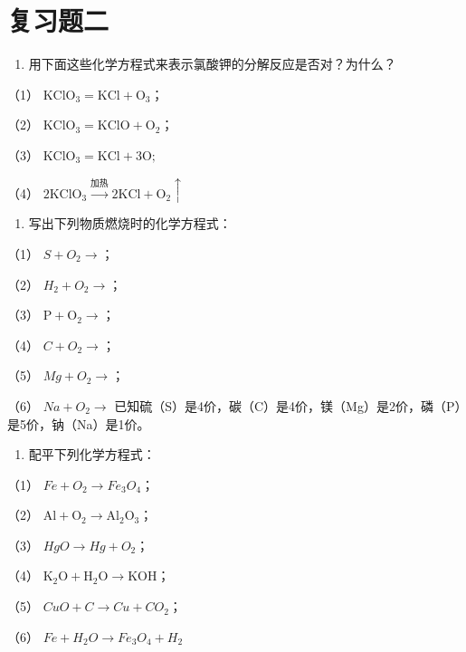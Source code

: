 \section{复习题二}

\begin{enumerate}
\item
  用下面这些化学方程式来表示氯酸钾的分解反应是否对？为什么？
\end{enumerate}

（1） \(\mathrm{KClO}_3 = \mathrm{KCl} + \mathrm{O}_3\)；

（2） \(\mathrm{KClO}_3 = \mathrm{KClO} + \mathrm{O}_2\)；

（3） \(\mathrm{KClO}_3 = \mathrm{KCl} + 3\mathrm{O};\)

（4）
\(2\mathrm{KClO}_3\xrightarrow{\text{加热}} 2\mathrm{KCl} + \mathrm{O}_2\uparrow\)

\begin{enumerate}[start=2]
\item
  写出下列物质燃烧时的化学方程式：
\end{enumerate}

（1） \(S + O_{2} \rightarrow\)；

（2） \(H_{2} + O_{2} \rightarrow\)；

（3） \(\mathrm{P} + \mathrm{O}_2 \longrightarrow\)；

（4） \(C + O_{2} \rightarrow\)；

（5） \(Mg + O_{2} \rightarrow\)；

（6） \(Na + O_{2} \rightarrow\)
已知硫（S）是4价，碳（C）是4价，镁（Mg）是2价，磷（P）是5价，钠（Na）是1价。

\begin{enumerate}[start=3]
\item
  配平下列化学方程式：
\end{enumerate}

（1） \(Fe + O_{2} \longrightarrow Fe_{3}O_{4}\)；

（2）
\(\mathrm{Al} + \mathrm{O}_2 \longrightarrow \mathrm{Al}_2\mathrm{O}_3\)；

（3） \(HgO \rightarrow Hg + O_{2}\)；

（4）
\(\mathrm{K}_2\mathrm{O} + \mathrm{H}_2\mathrm{O} \longrightarrow \mathrm{KOH}\)；

（5） \(CuO + C \longrightarrow Cu + CO_{2}\)；

（6） \(Fe + H_{2}O \longrightarrow Fe_{3}O_{4} + H_{2}\)

